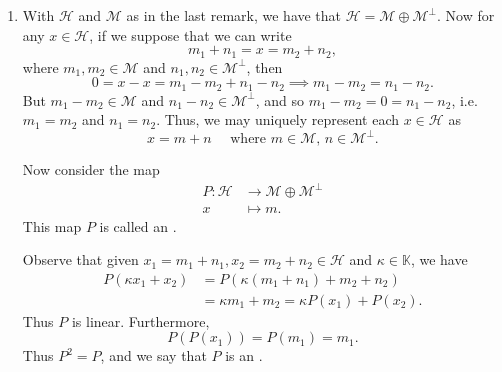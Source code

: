 \documentclass[notoc,notitlepage]{tufte-book}
\begin{document}
\begin{remark}
\begin{enumerate}
    \item {}
      With $\mathcal{H}$ and $\mathcal{M}$ as in the last remark,
      we have that $\mathcal{H} = \mathcal{M} \oplus \mathcal{M}^{\perp}$. 
      Now for any $x \in \mathcal{H}$, if we suppose that we can write
      \begin{equation*}
        m_1 + n_1 = x = m_2 + n_2,
      \end{equation*}
      where $m_1, m_2 \in \mathcal{M}$ and $n_1, n_2 \in \mathcal{M}^{\perp}$,
      then
      \begin{equation*}
        0 = x - x = m_1 - m_2 + n_1 - n_2 \implies
        m_1 - m_2 = n_1 - n_2.
      \end{equation*}
      But $m_1 - m_2 \in \mathcal{M}$ and $n_1 - n_2 \in \mathcal{M}^{\perp}$,
      and so $m_1 - m_2 = 0 = n_1 - n_2$,
      i.e. $m_1 = m_2$ and $n_1 = n_2$.
      Thus, we may uniquely represent each $x \in \mathcal{H}$ as
      \begin{equation*}
        x = m + n \quad
        \text{ where } m \in \mathcal{M},\, n \in \mathcal{M}^{\perp}.
      \end{equation*}

      Now consider the map
      \begin{align*}
        P : \mathcal{H} &\to \mathcal{M} \oplus \mathcal{M}^{\perp} \\
            x &\mapsto m.
      \end{align*}
      This map $P$ is called an .

      Observe that given $x_1 = m_1 + n_1, x_2 = m_2 + n_2 \in \mathcal{H}$
      and $\kappa \in \mathbb{K}$,
      we have
      \begin{align*}
        P(\kappa x_1 + x_2) &= P(\kappa (m_1 + n_1) + m_2 + n_2)  \\
                            &= \kappa m_1 + m_2 = \kappa P(x_1) + P(x_2).
      \end{align*}
      Thus $P$ is linear.
      Furthermore,
      \begin{equation*}
        P ( P ( x_1 ) ) = P( m_1 ) = m_1.
      \end{equation*}
      Thus $P^2 = P$, and we say that $P$ is an .
      

\end{enumerate}
\end{remark}
\end{document}
